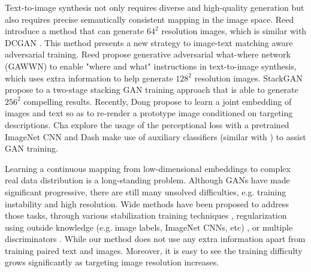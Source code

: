 \documentclass[10pt,twocolumn,letterpaper]{article}
\begin{document}
Text-to-image synthesis not only requires diverse and high-quality generation but also requires precise semantically consistent mapping in the image space.  Reed \etal \cite{reed2016generative} introduce a method that can generate $64^2$ resolution images, which is similar with DCGAN \cite{radford2015unsupervised}. This method presents a new strategy to image-text matching aware adversarial training. Reed \etal \cite{reed2016learning} propose generative
adversarial what-where network (GAWWN) to enable "where and what" instructions in text-to-image synthesis, which uses extra information to help generate $128^2$ resolution images. StackGAN \etal \cite{han2017stackgan} propose to a two-stage stacking GAN training approach that is able to generate $256^2$ compelling results. Recently, Dong \etal \cite{dong2017semantic} propose to learn a joint embedding of images and text so as to re-render a prototype image conditioned on targeting descriptions. Cha \etal \cite{char2017perceptual} explore the usage of the perceptional loss with a pretrained ImageNet CNN \cite{johnson2016perceptual} and Dash \etal \cite{dash2017tac} make use of auxiliary classifiers (similar with \cite{odena2016conditional}) to assist GAN training. 
	
Learning a continuous mapping from low-dimensional embeddings to complex real data distribution is a long-standing problem. Although GANs have made significant progressive, there are still many  unsolved difficulties, e.g. training instability and high resolution. Wide methods have been proposed to address those tasks, through various stabilization training techniques \cite{salimans2016improved,arjovsky2017wasserstein,berthelot2017began,shrivastava2016learning,odena2016conditional}, regularization using outside knowledge (e.g. image labels, ImageNet CNNs, etc) \cite{dosovitskiy2016generating,ledig2016photo,dash2017tac,dash2017tac}, or multiple discriminators  \cite{metz2016unrolled,durugkar2016generative,yang2017lr}. While our method does not use any extra information apart from training paired text and images. Moreover, it is easy to see the training difficulty grows significantly as targeting image resolution increases.

\end{document}
